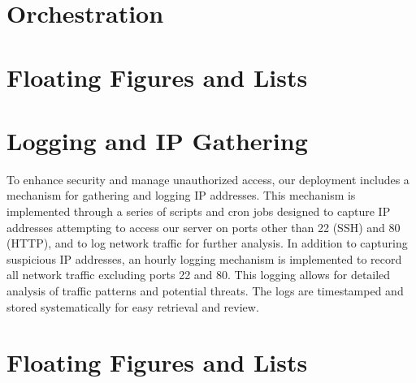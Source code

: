 \documentclass[letterpaper,twocolumn,10pt]{article}
\begin{document}
\section{Orchestration}


\section{Floating Figures and Lists}


\section{Logging and IP Gathering}
To enhance security and manage unauthorized access, our deployment includes a mechanism for 
gathering and logging IP addresses. This mechanism is implemented through a series of scripts 
and cron jobs designed to capture IP addresses attempting to access our server on ports other 
than 22 (SSH) and 80 (HTTP), and to log network traffic for further analysis.
In addition to capturing suspicious IP addresses, an hourly logging mechanism is implemented to 
record all network traffic excluding ports 22 and 80. This logging allows for detailed 
analysis of traffic patterns and potential threats. The logs are timestamped and stored systematically
for easy retrieval and review.


\section{Floating Figures and Lists}





\end{document}
